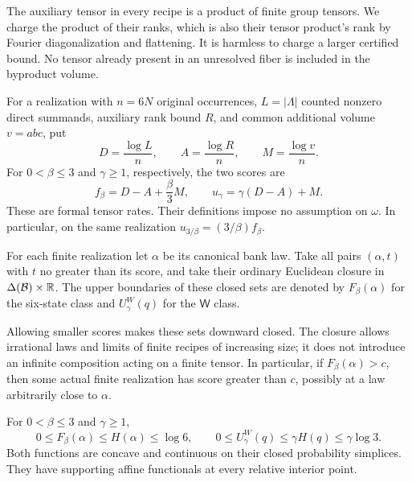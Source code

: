 The auxiliary tensor in every recipe is a product of finite group tensors.
We charge the product of their ranks, which is also their tensor product's
rank by Fourier diagonalization and flattening.  It is harmless to charge a
larger certified bound.  No tensor already present in an unresolved fiber is
included in the byproduct volume.

For a realization with $n=6N$ original occurrences, $L=|\Lambda|$ counted
nonzero direct summands, auxiliary rank bound $R$, and common additional
volume $v=abc$, put
\begin{equation}
 D=\frac{\log L}{n},\qquad
 A=\frac{\log R}{n},\qquad
 M=\frac{\log v}{n}.
\label{val:rates}
\end{equation}
For $0<\beta\le3$ and $\gamma\ge1$, respectively, the two scores are
\begin{equation}
 f_\beta=D-A+\frac\beta3M,
 \qquad
 u_\gamma=\gamma(D-A)+M.
\label{val:scores}
\end{equation}
These are formal tensor rates.  Their definitions impose no assumption on
$\omega$.  In particular, on the same realization
$u_{3/\beta}=(3/\beta)f_\beta$.

\begin{definition}
\label{val:def-value}
For each finite realization let $\alpha$ be its canonical bank law.  Take all
pairs $(\alpha,t)$ with $t$ no greater than its score, and take their ordinary
Euclidean closure in $\Delta(\mathcal B)\times\mathbb R$.  The upper boundaries of
these closed sets are denoted by $F_\beta(\alpha)$ for the six-state class
and $U^W_\gamma(q)$ for the $\mathsf W$ class.
\end{definition}

Allowing smaller scores makes these sets downward closed.  The closure allows
irrational laws and limits of finite recipes of increasing size; it does not
introduce an infinite composition acting on a finite tensor.  In particular,
if $F_\beta(\alpha)>c$, then some actual finite realization has score greater
than $c$, possibly at a law arbitrarily close to $\alpha$.

\begin{proposition}
\label{prop:values}
For $0<\beta\le3$ and $\gamma\ge1$,
\begin{equation}
 0\le F_\beta(\alpha)\le H(\alpha)\le\log6,
 \qquad
 0\le U^W_\gamma(q)\le\gamma H(q)\le\gamma\log3.
\label{val:entropy-cap}
\end{equation}
Both functions are concave and continuous on their closed probability
simplices.  They have supporting affine functionals at every relative
interior point.
\end{proposition}


